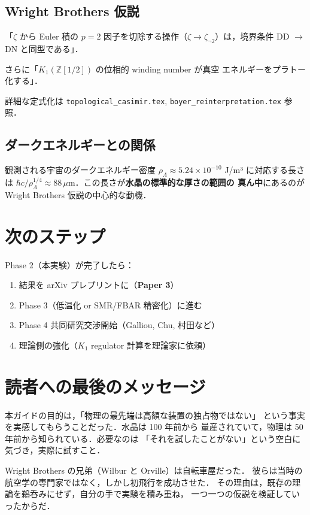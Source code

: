 \documentclass[11pt,a4paper]{article}
\begin{document}
\subsection{Wright Brothers 仮説}

「$\zeta$ から Euler 積の $p=2$ 因子を切除する操作（$\zeta \to
\zeta_{\neg 2}$）は，境界条件 DD $\to$ DN と同型である」．

さらに「$K_1(\mathbb{Z}[1/2])$ の位相的 winding number が真空
エネルギーをプラトー化する」．

詳細な定式化は \texttt{topological\_casimir.tex},
\texttt{boyer\_reinterpretation.tex} 参照．

\subsection{ダークエネルギーとの関係}

観測される宇宙のダークエネルギー密度 $\rho_\Lambda \approx
5.24\times 10^{-10}$ J/m³ に対応する長さは $\hbar c /\rho_\Lambda^{1/4}
\approx 88\,\mu$m．この長さが\textbf{水晶の標準的な厚さの範囲の
真ん中}にあるのが Wright Brothers 仮説の中心的な動機．

\section{次のステップ}

Phase 2（本実験）が完了したら：

\begin{enumerate}
\item 結果を arXiv プレプリントに（\textbf{Paper 3}）
\item Phase 3（低温化 or SMR/FBAR 精密化）に進む
\item Phase 4 共同研究交渉開始（Galliou, Chu, 村田など）
\item 理論側の強化（$K_1$ regulator 計算を理論家に依頼）
\end{enumerate}

\section{読者への最後のメッセージ}

本ガイドの目的は，「物理の最先端は高額な装置の独占物ではない」
という事実を実感してもらうことだった．水晶は 100 年前から
量産されていて，物理は 50 年前から知られている．必要なのは
「それを試したことがない」という空白に気づき，実際に試すこと．

Wright Brothers の兄弟（Wilbur と Orville）は自転車屋だった．
彼らは当時の航空学の専門家ではなく，しかし初飛行を成功させた．
その理由は，既存の理論を鵜呑みにせず，自分の手で実験を積み重ね，
一つ一つの仮説を検証していったからだ．
\end{document}
